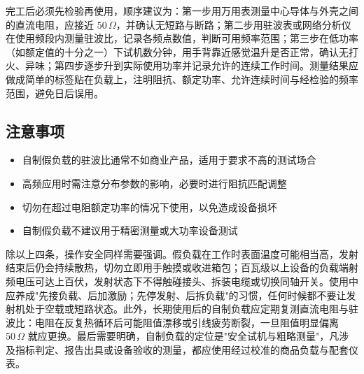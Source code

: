 完工后必须先检验再使用，顺序建议为：第一步用万用表测量中心导体与外壳之间的直流电阻，应接近 $50\,\Omega$，并确认无短路与断路；第二步用驻波表或网络分析仪在使用频段内测量驻波比，记录各频点数值，判断可用频率范围；第三步在低功率（如额定值的十分之一）下试机数分钟，用手背靠近感觉温升是否正常，确认无打火、异味；第四步逐步升到实际使用功率并记录允许的连续工作时间。测量结果应做成简单的标签贴在负载上，注明阻抗、额定功率、允许连续时间与经检验的频率范围，避免日后误用。

\subsection{注意事项}

\begin{itemize}
    \item 自制假负载的驻波比通常不如商业产品，适用于要求不高的测试场合
    \item 高频应用时需注意分布参数的影响，必要时进行阻抗匹配调整
    \item 切勿在超过电阻额定功率的情况下使用，以免造成设备损坏
    \item 自制假负载不建议用于精密测量或大功率设备测试
\end{itemize}

除以上四条，操作安全同样需要强调。假负载在工作时表面温度可能相当高，发射结束后仍会持续散热，切勿立即用手触摸或收进箱包；百瓦级以上设备的负载端射频电压可达上百伏，发射状态下不得触碰接头、拆装电缆或切换同轴开关。使用中应养成"先接负载、后加激励；先停发射、后拆负载"的习惯，任何时候都不要让发射机处于空载或短路状态。此外，长期使用后的自制负载应定期复测直流电阻与驻波比：电阻在反复热循环后可能阻值漂移或引线疲劳断裂，一旦阻值明显偏离 $50\,\Omega$ 就应更换。最后需要明确，自制负载的定位是"安全试机与粗略测量"，凡涉及指标判定、报告出具或设备验收的测量，都应使用经过校准的商品负载与配套仪表。
